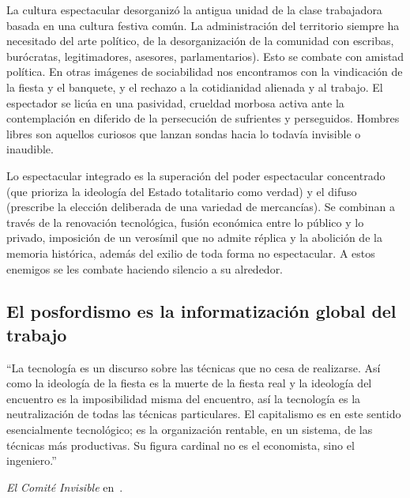 La cultura espectacular desorganizó la antigua unidad de la clase trabajadora basada en una cultura festiva común. La administración del territorio siempre ha necesitado del arte político, de la desorganización de la comunidad con escribas, burócratas, legitimadores, asesores, parlamentarios). Esto se combate con amistad política. En otras imágenes de sociabilidad nos encontramos con la vindicación de la fiesta y el banquete, y el rechazo a la cotidianidad alienada y al trabajo. El espectador se licúa en una pasividad, crueldad morbosa activa ante la contemplación en diferido de la persecución de sufrientes y perseguidos. Hombres libres son aquellos curiosos que lanzan sondas hacia lo todavía invisible o inaudible.

Lo espectacular integrado es la superación del poder espectacular concentrado (que prioriza la ideología del Estado totalitario como verdad) y el difuso (prescribe la elección deliberada de una variedad de mercancías). Se combinan a través de la renovación tecnológica, fusión económica entre lo público y lo privado, imposición de un verosímil que no admite réplica y la abolición de la memoria histórica, además del exilio de toda forma no espectacular. A estos enemigos se les combate haciendo silencio a su alrededor.

\subsection{El posfordismo es la informatización global del trabajo}
\label{sub:el-posfordismo-es-la-informatización-global-del-trabajo}

\epigraph{\enquote{La tecnología es un discurso sobre las técnicas que no cesa de realizarse. Así como la ideología de la fiesta es la muerte de la fiesta real y la ideología del encuentro es la imposibilidad misma del encuentro, así la tecnología es la neutralización de todas las técnicas particulares. El capitalismo es en este sentido esencialmente tecnológico; es la organización rentable, en un sistema, de las técnicas más productivas. Su figura cardinal no es el economista, sino el ingeniero.}}{\emph{El Comité Invisible} en~\autocite[p.~131]{comiteinvisibleNuestrosAmigos2015}.}


